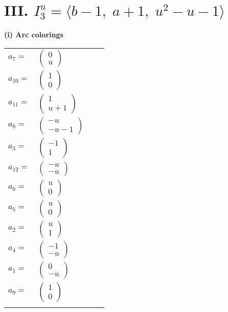 \documentclass[1p]{elsarticle_modified}
\theoremstyle{definition}
\begin{document}
\centering \section*{III. $I^u_{3}= \langle b-1,\;a+1,\;u^2- u-1 \rangle$}
\flushleft \textbf{(i) Arc colorings}\\
\begin{tabular}{m{7pt} m{180pt} m{7pt} m{180pt} }
\flushright $a_{7}=$&$\begin{pmatrix}0\\u\end{pmatrix}$ \\
\flushright $a_{10}=$&$\begin{pmatrix}1\\0\end{pmatrix}$ \\
\flushright $a_{11}=$&$\begin{pmatrix}1\\u+1\end{pmatrix}$ \\
\flushright $a_{8}=$&$\begin{pmatrix}- u\\- u-1\end{pmatrix}$ \\
\flushright $a_{3}=$&$\begin{pmatrix}-1\\1\end{pmatrix}$ \\
\flushright $a_{12}=$&$\begin{pmatrix}- u\\- u\end{pmatrix}$ \\
\flushright $a_{6}=$&$\begin{pmatrix}u\\0\end{pmatrix}$ \\
\flushright $a_{5}=$&$\begin{pmatrix}u\\0\end{pmatrix}$ \\
\flushright $a_{2}=$&$\begin{pmatrix}u\\1\end{pmatrix}$ \\
\flushright $a_{4}=$&$\begin{pmatrix}-1\\- u\end{pmatrix}$ \\
\flushright $a_{1}=$&$\begin{pmatrix}0\\- u\end{pmatrix}$ \\
\flushright $a_{9}=$&$\begin{pmatrix}1\\0\end{pmatrix}$\\&\end{tabular}
\end{document}
